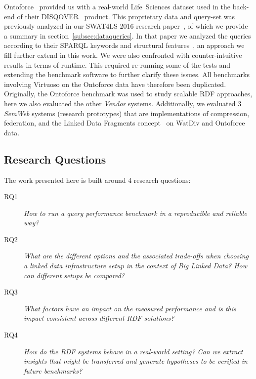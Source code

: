 Ontoforce~\cite{ontoforcewebsite} provided us with a real-world \mbox{Life Sciences} dataset used in the back-end of their \mbox{DISQOVER}~\cite{disqover} product. This proprietary data and query-set was previously analyzed in our SWAT4LS 2016 research paper~\cite{dewitte_swat4ls_2016}, of which we provide a summary in section~\ref{subsec:dataqueries}.
In that paper we analyzed the queries according to their SPARQL keywords and structural features~\cite{DBLP:journals/corr/abs-1103-5043}, an approach we fill further extend in this work. 
We were also confronted with counter-intuitive results in terms of runtime. This required re-running some of the tests and extending the benchmark software to further clarify these issues. All benchmarks involving Virtuoso on the Ontoforce data have therefore been duplicated.
Originally, the Ontoforce benchmark was used to study scalable RDF approaches, here we also evaluated the other \emph{Vendor} systems. Additionally, we evaluated 3 \emph{SemWeb} systems (research prototypes) that are implementations of compression, federation, and the Linked Data Fragments concept~\cite{DBLP:conf/semweb/VerborghHMHVSCCMW14} on WatDiv and Ontoforce data.

\subsection{Research Questions}

The work presented here is built around 4 research questions:

\begin{description}
\item[RQ1] \emph{How to run a query performance benchmark in a reproducible and reliable way?}
\item[RQ2] \emph{What are the different options and the associated trade-offs when choosing a linked data infrastructure setup in the context of Big Linked Data? How can different setups be compared?}
\item[RQ3] \emph{What factors have an impact on the measured performance and is this impact consistent across different RDF solutions?}
\item[RQ4] \emph{How do the RDF systems behave in a real-world setting? Can we extract insights that might be transferred and generate hypotheses to be verified in future benchmarks?}
\end{description} 

